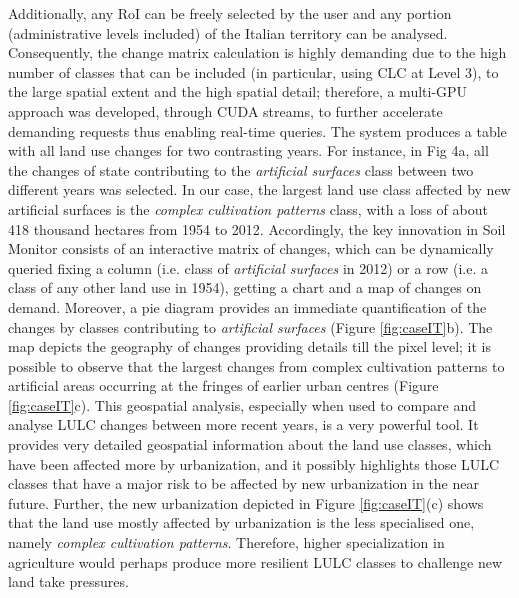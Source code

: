\documentclass[APA,LATO1COL,doublespace]{WileyNJD-v2}
\begin{document}
Additionally, any RoI can be freely selected by the user and any portion (administrative levels included) of the Italian territory can be analysed. Consequently, the change matrix calculation is highly demanding due to the high number of classes that can be included (in particular, using CLC at Level 3), to the large spatial extent and the high spatial detail; therefore, a multi-GPU approach was developed, through CUDA streams, to further accelerate demanding requests thus enabling real-time queries. 
The system produces a table with all land use changes for two contrasting years. 
For instance, in Fig 4a, all the changes of state contributing to the \textit{artificial surfaces} class between two different years was selected. 
In our case, the largest land use class affected by new artificial surfaces is the \textit{complex cultivation patterns} class, with a loss of about 418 thousand hectares from 1954 to 2012. 
Accordingly, the key innovation in Soil Monitor consists of an interactive matrix of changes, which can be dynamically queried fixing a column (i.e. class of \textit{artificial surfaces} in 2012) or a row (i.e. a class of any other land use in 1954), getting a chart and a map of changes on demand. 
Moreover, a pie diagram provides an immediate quantification of the changes by classes contributing to \textit{artificial surfaces} (Figure \ref{fig:caseIT}b). 
The map depicts the geography of changes providing details till the pixel level; it is possible to observe that the largest changes from complex cultivation patterns to artificial areas occurring at the fringes of earlier urban centres (Figure \ref{fig:caseIT}c). 
This geospatial analysis, especially when used to compare and analyse LULC changes between more recent years, is a very powerful tool. 
It provides very detailed geospatial information about the land use classes, which have been affected more by urbanization, and it possibly highlights those LULC classes that have a major risk to be affected by new urbanization in the near future. 
Further, the new urbanization depicted in Figure \ref{fig:caseIT}(c) shows that the land use mostly affected by urbanization is the less specialised one, namely \textit{complex cultivation patterns}. 
Therefore, higher specialization in agriculture would perhaps produce more resilient LULC classes to challenge new land take pressures.
\end{document}
